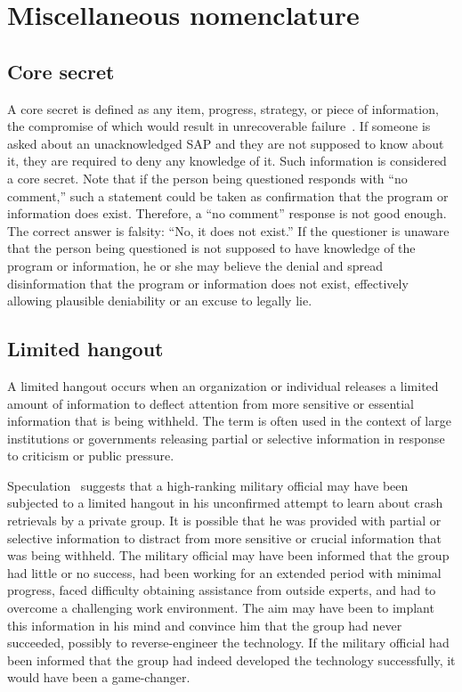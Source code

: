 \section{Miscellaneous nomenclature}
\label{2023-UFO-part-Perception-crash-retreivals-MN}

\subsection{Core secret}

A core secret is defined as any item, progress, strategy, or piece of information, the compromise of which would result in unrecoverable failure~\cite{Sweetman2000}.
If someone is asked about an unacknowledged SAP and they are not supposed to know about it, they are required to deny any knowledge of it. Such information is considered a core secret.
Note that if the person being questioned responds with ``no comment,''
such a statement could be taken as confirmation that the program or information does exist.
Therefore, a ``no comment'' response is not good enough.
The correct answer is falsity: ``No, it does not exist.''
If the questioner is unaware that the person being questioned is not supposed to have knowledge of the program or information, he or she may believe the denial and spread disinformation that the program or information does not exist, effectively allowing plausible deniability or an excuse to legally lie.

\subsection{Limited hangout}

A limited hangout occurs when an organization or individual releases a limited amount of information to deflect attention from more sensitive or essential information that is being withheld. The term is often used in the context of large institutions or governments releasing partial or selective information in response to criticism or public pressure.

Speculation~\cite{Dolan-MrX-Disclosure2020Jul} suggests that a high-ranking military official may have been subjected to a limited hangout in his unconfirmed attempt to learn about crash retrievals by a private group. It is possible that he was provided with partial or selective information to distract from more sensitive or crucial information that was being withheld. The military official may have been informed that the group had little or no success, had been working for an extended period with minimal progress, faced difficulty obtaining assistance from outside experts, and had to overcome a challenging work environment. The aim may have been to implant this information in his mind and convince him that the group had never succeeded, possibly to reverse-engineer the technology. If the military official had been informed that the group had indeed developed the technology successfully, it would have been a game-changer.



